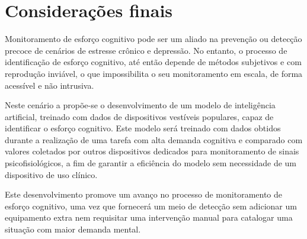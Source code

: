 \chapter{Considerações finais}
Monitoramento de esforço cognitivo pode ser um aliado na prevenção ou detecção precoce de cenários de estresse crônico e depressão. No entanto, o processo de identificação de esforço cognitivo, até então depende de métodos subjetivos e com reprodução inviável, o que impossibilita o seu monitoramento em escala, de forma acessível e não intrusiva.

Neste cenário a propõe-se o desenvolvimento de um modelo de inteligência artificial, treinado com dados de dispositivos vestíveis populares, capaz de identificar o esforço cognitivo. Este modelo será treinado com dados obtidos durante a realização de uma tarefa com alta demanda cognitiva e comparado com valores coletados por outros dispositivos dedicados para monitoramento de sinais psicofisiológicos, a fim de garantir a eficiência do modelo sem necessidade de um dispositivo de uso clínico.

Este desenvolvimento promove um avanço no processo de monitoramento de esforço cognitivo, uma vez que fornecerá um meio de detecção sem adicionar um equipamento extra nem requisitar uma intervenção manual para catalogar uma situação com maior demanda mental. 

